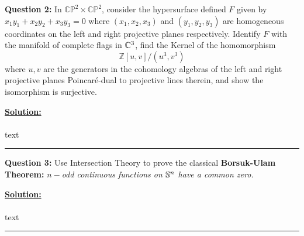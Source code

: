 \documentclass[11pt]{article}
\begin{document}
\begin{bluebox}
  \textbf{Question 2:} In $\mathbb{CP}^2 \times \mathbb{CP}^2$, consider the hypersurface defined $F$ given by $x_1y_1 + x_2y_2 + x_3y_3 = 0$ where $(x_1, x_2, x_3)$ and $(y_1, y_2, y_3)$ are homogeneous coordinates on the left and right projective planes respectively. Identify $F$ with the manifold of complete flags in $\mathbb{C}^3$, find the Kernel of the homomorphism $$ \mathbb{Z}[u,v]/(u^3, v^3) $$ where $u, v$ are the generators in the cohomology algebras of the left and right projective planes Poincar\'e-dual to projective lines therein, and show the isomorphism is surjective.
\end{bluebox}

\vskip 0.5cm
\textbf{\underline{Solution:}}
\\
\\
text
\vskip 0.5cm
\hrule
\pagebreak




\begin{bluebox}
  \textbf{Question 3:} Use Intersection Theory to prove the classical \textbf{Borsuk-Ulam Theorem:} \textit{$n-$odd continuous functions on $\mathbb{S}^n$ have a common zero.}
\end{bluebox}

\vskip 0.5cm
\textbf{\underline{Solution:}}
\\
\\
text
\vskip 0.5cm
\hrule
\pagebreak














% 
\end{document}
